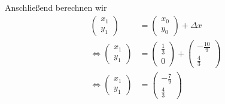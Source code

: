 Anschließend berechnen wir
\begin{align}
	\begin{pmatrix}
		x_1\\
		y_1
	\end{pmatrix} &= 
	\begin{pmatrix}
		x_0\\
		y_0
	\end{pmatrix}+\Delta x \\
	\Leftrightarrow\begin{pmatrix}
		x_1\\
		y_1
	\end{pmatrix} &= 
	\begin{pmatrix}
		\frac{1}{3}\\
		0
	\end{pmatrix} +
	\begin{pmatrix}
		-\frac{10}{9}\\
		\frac{4}{3}
	\end{pmatrix} \\
	\Leftrightarrow\begin{pmatrix}
		x_1\\
		y_1
	\end{pmatrix} &= 
	\begin{pmatrix}
		-\frac{7}{9}\\
		\frac{4}{3}
	\end{pmatrix}
\end{align}
